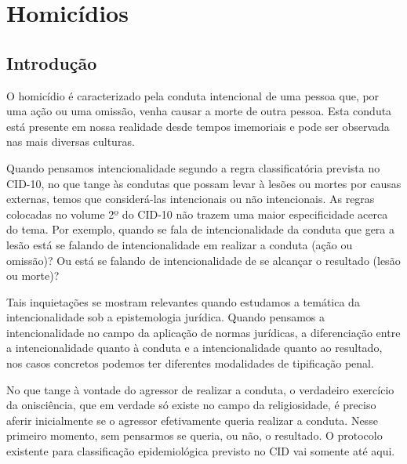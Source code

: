 \chapter{Homicídios}

\section{Introdução}


O homicídio é caracterizado pela conduta intencional de uma pessoa que, por uma ação ou uma omissão, venha causar a morte de outra pessoa. Esta conduta está presente em nossa realidade desde tempos imemoriais e pode ser observada nas mais diversas culturas.








Quando pensamos intencionalidade segundo a regra classificatória prevista no CID-10, no que tange às condutas que possam levar à lesões ou mortes por causas externas, temos que considerá-las intencionais ou não intencionais. As regras colocadas no volume 2º do CID-10 não trazem uma maior especificidade acerca do tema. Por exemplo, quando se fala de intencionalidade da conduta que gera a lesão está se falando de intencionalidade em realizar a conduta (ação ou omissão)? Ou está se falando de intencionalidade de se alcançar o resultado (lesão ou morte)?

Tais inquietações se mostram relevantes quando estudamos a temática da intencionalidade sob a epistemologia jurídica. Quando pensamos a intencionalidade no campo da aplicação de normas jurídicas, a diferenciação entre a intencionalidade quanto à conduta e a intencionalidade quanto ao resultado, nos casos concretos podemos ter diferentes modalidades de tipificação penal.

No que tange à vontade do agressor de realizar a conduta, o verdadeiro exercício da onisciência, que em verdade só existe no campo da religiosidade, é preciso aferir inicialmente se o agressor efetivamente queria realizar a conduta. Nesse primeiro momento, sem pensarmos se queria, ou não, o resultado. O protocolo existente para classificação epidemiológica previsto no CID vai somente até aqui.


